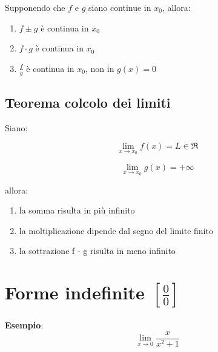 Supponendo che $f$ e $g$ siano continue in $x_0$, allora:
\begin{enumerate}
    \item $f \pm g$ è continua in $x_0$
    \item $f \cdot g$ è continua in $x_0$
    \item $\frac{f}{g}$ è continua in $x_0$, non in $g(x) =0$
\end{enumerate}

\subsection{Teorema colcolo dei limiti}

Siano:

\begin{equation*}
    \lim_{x \rightarrow x_0} f(x) = L \in \Re
\end{equation*}

\begin{equation*}
    \lim_{x \rightarrow x_0} g(x) = +\infty
\end{equation*}

allora:

\begin{enumerate}
    \item la somma risulta in più infinito
    \item la moltiplicazione dipende dal segno del limite finito
    \item la sottrazione f - g risulta in meno infinito 
\end{enumerate}

\section{Forme indefinite $[\frac{0}{0}]$}

\textbf{Esempio}:
\begin{equation}
    \lim_{x \rightarrow 0} \frac{x}{x^2 + 1}
\end{equation} 
